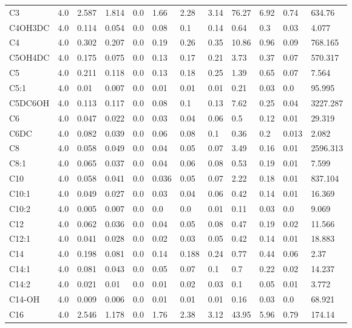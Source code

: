 \begin{tabular}{llllllllllll}
C3 & 4.0 & 2.587 & 1.814 & 0.0 & 1.66 & 2.28 & 3.14 & 76.27 & 6.92 & 0.74 & 634.76 \\
C4OH\C3DC & 4.0 & 0.114 & 0.054 & 0.0 & 0.08 & 0.1 & 0.14 & 0.64 & 0.3 & 0.03 & 4.077 \\
C4 & 4.0 & 0.302 & 0.207 & 0.0 & 0.19 & 0.26 & 0.35 & 10.86 & 0.96 & 0.09 & 768.165 \\
C5OH\C4DC & 4.0 & 0.175 & 0.075 & 0.0 & 0.13 & 0.17 & 0.21 & 3.73 & 0.37 & 0.07 & 570.317 \\
C5 & 4.0 & 0.211 & 0.118 & 0.0 & 0.13 & 0.18 & 0.25 & 1.39 & 0.65 & 0.07 & 7.564 \\
C5:1 & 4.0 & 0.01 & 0.007 & 0.0 & 0.01 & 0.01 & 0.01 & 0.21 & 0.03 & 0.0 & 95.995 \\
C5DC\C6OH & 4.0 & 0.113 & 0.117 & 0.0 & 0.08 & 0.1 & 0.13 & 7.62 & 0.25 & 0.04 & 3227.287 \\
C6 & 4.0 & 0.047 & 0.022 & 0.0 & 0.03 & 0.04 & 0.06 & 0.5 & 0.12 & 0.01 & 29.319 \\
C6DC & 4.0 & 0.082 & 0.039 & 0.0 & 0.06 & 0.08 & 0.1 & 0.36 & 0.2 & 0.013 & 2.082 \\
C8 & 4.0 & 0.058 & 0.049 & 0.0 & 0.04 & 0.05 & 0.07 & 3.49 & 0.16 & 0.01 & 2596.313 \\
C8:1 & 4.0 & 0.065 & 0.037 & 0.0 & 0.04 & 0.06 & 0.08 & 0.53 & 0.19 & 0.01 & 7.599 \\
C10 & 4.0 & 0.058 & 0.041 & 0.0 & 0.036 & 0.05 & 0.07 & 2.22 & 0.18 & 0.01 & 837.104 \\
C10:1 & 4.0 & 0.049 & 0.027 & 0.0 & 0.03 & 0.04 & 0.06 & 0.42 & 0.14 & 0.01 & 16.369 \\
C10:2 & 4.0 & 0.005 & 0.007 & 0.0 & 0.0 & 0.0 & 0.01 & 0.11 & 0.03 & 0.0 & 9.069 \\
C12 & 4.0 & 0.062 & 0.036 & 0.0 & 0.04 & 0.05 & 0.08 & 0.47 & 0.19 & 0.02 & 11.566 \\
C12:1 & 4.0 & 0.041 & 0.028 & 0.0 & 0.02 & 0.03 & 0.05 & 0.42 & 0.14 & 0.01 & 18.883 \\
C14 & 4.0 & 0.198 & 0.081 & 0.0 & 0.14 & 0.188 & 0.24 & 0.77 & 0.44 & 0.06 & 2.37 \\
C14:1 & 4.0 & 0.081 & 0.043 & 0.0 & 0.05 & 0.07 & 0.1 & 0.7 & 0.22 & 0.02 & 14.237 \\
C14:2 & 4.0 & 0.021 & 0.01 & 0.0 & 0.01 & 0.02 & 0.03 & 0.1 & 0.05 & 0.01 & 3.772 \\
C14-OH & 4.0 & 0.009 & 0.006 & 0.0 & 0.01 & 0.01 & 0.01 & 0.16 & 0.03 & 0.0 & 68.921 \\
C16 & 4.0 & 2.546 & 1.178 & 0.0 & 1.76 & 2.38 & 3.12 & 43.95 & 5.96 & 0.79 & 174.14 \\

\end{tabular}
